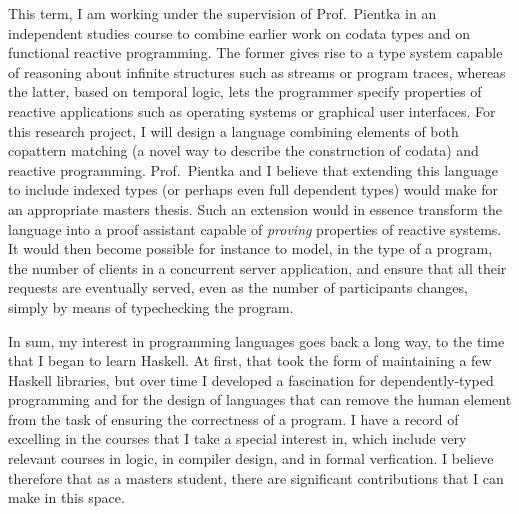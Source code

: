 \documentclass[11pt,letterpaper]{article}
\begin{document}
This term, I am working under the supervision of Prof.~Pientka in an
independent studies course to combine earlier work on codata types and on
functional reactive programming. The former gives rise to a type system capable
of reasoning about infinite structures such as streams or program traces,
whereas the latter, based on temporal logic, lets the programmer specify
properties of reactive applications such as operating systems or graphical user
interfaces.
%
For this research project, I will design a language combining elements of both
copattern matching (a novel way to describe the construction of codata) and
reactive programming. Prof.~Pientka and I believe that extending this language
to include indexed types (or perhaps even full dependent types) would make for
an appropriate masters thesis. Such an extension would in essence transform the
language into a proof assistant capable of \emph{proving} properties of
reactive systems. It would then become possible for instance to model, in the
type of a program, the number of clients in a concurrent server application,
and ensure that all their requests are eventually served, even as the number of
participants changes, simply by means of typechecking the program.

In sum, my interest in programming languages goes back a long way, to the
time that I began to learn Haskell. At first, that took the form of maintaining
a few Haskell libraries, but over time I developed a fascination for
dependently-typed programming and for the design of languages that can remove
the human element from the task of ensuring the correctness of a program.
%
I have a record of excelling in the courses that I take a special interest in,
which include very relevant courses in logic, in compiler design, and in formal
verfication.
%
I believe therefore that as a masters student, there are significant
contributions that I can make in this space.
\end{document}
